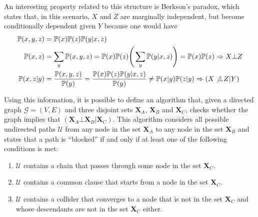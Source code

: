 \documentclass{report}
\begin{document}
\begin{enumerate}

    \noindent An interesting property related to this structure is Berkson's paradox, which states that, in this scenario, $\displaystyle X$ and $\displaystyle Z$ are marginally independent, but become conditionally dependent given $\displaystyle Y$ because one would have
    \begin{align*}
        \mathbb{P}(x, y, z) &= \mathbb{P}(x)\mathbb{P}(z)\mathbb{P}(y|x, z) \\
        \mathbb{P}(x, z) &= \sum_y \mathbb{P}(x, y, z) = \mathbb{P}(x)\mathbb{P}(z)\Bigg(\sum_y \mathbb{P}(y|x, z)\Bigg) = \mathbb{P}(x)\mathbb{P}(z) \Rightarrow X \bot Z \\
        \mathbb{P}(x, z|y) &= \frac{\mathbb{P}(x, y, z)}{\mathbb{P}(y)} = \frac{\mathbb{P}(x)\mathbb{P}(z)\mathbb{P}(y|x, z)}{\mathbb{P}(y)} \neq \mathbb{P}(x|y)\mathbb{P}(z|y) \Rightarrow (X \not\bot Z|Y)
    \end{align*}
\end{enumerate}
Using this information, it is possible to define an algorithm that, given a directed graph $\displaystyle \mathcal{G} = (V, E)$ and three disjoint sets $\displaystyle \mathbf{X}_A$, $\mathbf{X}_B$ and $\displaystyle \mathbf{X}_C$, checks whether the graph implies that $\displaystyle (\mathbf{X}_A \bot \mathbf{X}_B|\mathbf{X}_C)$. \newline
This algorithm considers all possible undirected paths $\displaystyle \mathcal{U}$ from any node in the set $\displaystyle \mathbf{X}_A$ to any node in the set $\displaystyle \mathbf{X}_B$ and states that a path is ``blocked'' if and only if at least one of the following conditions is met:
\begin{enumerate}
    \item $\displaystyle \mathcal{U}$ contains a chain that passes through some node in the set $\displaystyle \mathbf{X}_C$.
    \item $\displaystyle \mathcal{U}$ contains a common clause that starts from a node in the set $\displaystyle \mathbf{X}_C$.
    \item $\displaystyle \mathcal{U}$ contains a collider that converges to a node that is not in the set $\displaystyle \mathbf{X}_C$ and whose descendants are not in the set $\displaystyle \mathbf{X}_C$ either.
\end{enumerate}
\end{document}
